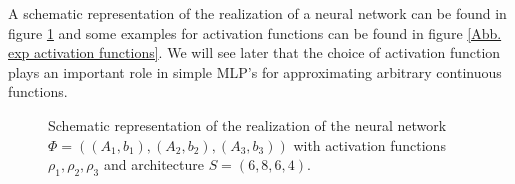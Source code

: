 \documentclass[11pt,titlepage]{article}
\theoremstyle{definition}
\theoremstyle{remark}
\begin{document}
	A schematic representation of the 
	realization of a neural network can be found in figure \ref{Abb. neural network} and 
	some examples for activation functions can be found in figure \ref{Abb. exp activation functions}.
	We will see later that the choice of activation function plays an important role in simple MLP's for approximating arbitrary continuous functions.
		
	\begin{figure}[!h]
		\caption{Schematic representation of the realization of the neural network 
			$\Phi = ((A_1, b_1), (A_2, b_2), (A_3, b_3))$ with activation 
			functions $\rho_1, \rho_2, \rho_3$ and architecture 
			$S = (6, 8, 6, 4)$.} \label{Abb. neural network}
	\end{figure} 
	
\end{document}

